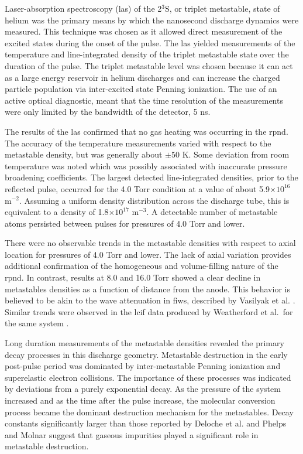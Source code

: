 Laser-absorption spectroscopy (\acs{las}) of the 2$^3$S, or triplet metastable,
state of helium was the primary means by which the nanosecond discharge dynamics
were measured. This technique was chosen as it allowed direct measurement of the
excited states during the onset of the pulse. The \acs{las} yielded measurements
of the temperature and line-integrated density of the triplet metastable state
over the duration of the pulse. The triplet metastable level was chosen because
it can act as a large energy reservoir in helium discharges and can increase the
charged particle population via inter-excited state Penning ionization. The use
of an active optical diagnostic, meant that the time resolution of the
measurements were only limited by the bandwidth of the detector, 5 ns.

The results of the \acs{las} confirmed that no gas heating was occurring in the
\acs{rpnd}. The accuracy of the temperature measurements varied with respect to
the metastable density, but was generally about $\pm50$ K. Some deviation from
room temperature was noted which was possibly associated with inaccurate
pressure broadening coefficients. The largest detected line-integrated
densities, prior to the reflected pulse, occurred for the 4.0 Torr condition at
a value of about 5.9$\times10^{16}$ m$^{-2}$. Assuming a uniform density
distribution across the discharge tube, this is equivalent to a density of
1.8$\times10^{17}$ m$^{-3}$. A detectable number of metastable atoms persisted
between pulses for pressures of 4.0 Torr and lower.

There were no observable trends in the metastable densities with respect to
axial location for pressures of 4.0 Torr and lower. The lack of axial variation
provides additional confirmation of the homogeneous and volume-filling nature of
the \acs{rpnd}. In contrast, results at 8.0 and 16.0 Torr showed a clear decline
in metastables densities as a function of distance from the anode. This behavior
is believed to be akin to the wave attenuation in \acs{fiw}s, described by
Vasilyak et al. \cite{Vasilyak1994}. Similar trends were observed in the
\acs{lcif} data produced by Weatherford et al.\ for the same system
\cite{Weatherford2012}.

Long duration measurements of the metastable densities revealed the primary
decay processes in this discharge geometry. Metastable destruction in the early
post-pulse period was dominated by inter-metastable Penning ionization and
superelastic electron collisions. The importance of these processes was
indicated by deviations from a purely exponential decay. As the pressure of the
system increased and as the time after the pulse increase, the molecular
conversion process became the dominant destruction mechanism for the
metastables. Decay constants significantly larger than those reported by Deloche
et al. \cite{Deloche1976} and Phelps and Molnar \cite{Phelps1953} suggest that
gaseous impurities played a significant role in metastable destruction.

